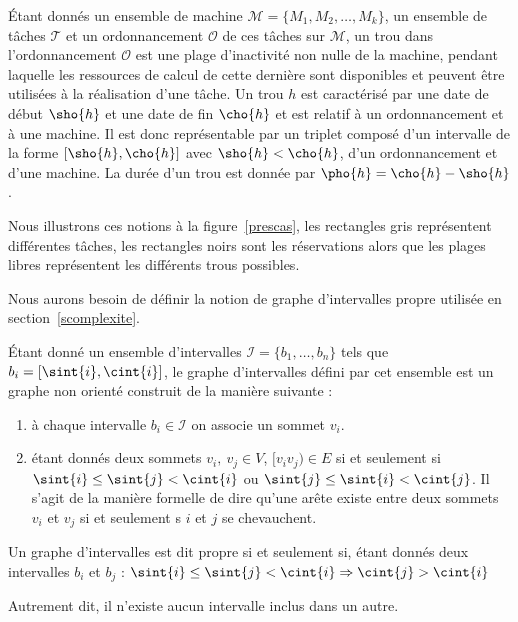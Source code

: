 \begin{ndf}[Trou]
    Étant donnés un ensemble de machine $\mathcal{M} = \{M_1, M_2, \dots, M_k\}$, un ensemble de
    tâches $\mathcal{T}$ et un ordonnancement $\mathcal{O}$ de ces tâches sur $\mathcal{M}$, un trou
    dans l'ordonnancement $\mathcal{O}$ est une plage d'inactivité non nulle de la machine, pendant
    laquelle les ressources de calcul de cette dernière sont disponibles et peuvent être utilisées à
    la réalisation d'une tâche. Un trou $h$ est caractérisé par une date de début $\sho{h}$ et
    une date de fin $\cho{h}$ et est relatif à un ordonnancement et à une machine. Il est donc
    représentable par un triplet composé d'un intervalle de la forme $[\sho{h}, \cho{h}]$ avec
    $\sho{h} < \cho{h}$, d'un ordonnancement et d'une machine. La durée d'un trou est donnée
    par $\pho{h} = \cho{h} - \sho{h}$.
\end{ndf}

Nous illustrons ces notions à la figure~\ref{prescas}, les rectangles gris
représentent différentes tâches, les rectangles noirs sont les réservations alors que les plages
libres représentent les différents trous possibles.

Nous aurons besoin de définir la notion de graphe d'intervalles propre utilisée en
section~\ref{scomplexite}.

\begin{ndf}
    Étant donné un ensemble d'intervalles $\mathcal{I} = \{b_1, \dots, b_n\}$ tels que $b_i = [\sint{i},
    \cint{i}]$, le graphe d'intervalles défini par cet ensemble est un graphe non orienté construit de la
    manière suivante :
    \begin{enumerate}
        \item à chaque intervalle $b_i \in \mathcal{I}$ on associe un sommet $v_i$.
        \item étant donnés deux sommets $v_i,\ v_j \in V$, $[v_iv_j) \in E$ si et seulement si 
            $\sint{i} \leq \sint{j} < \cint{i}$ ou $\sint{j} \leq \sint{i} < \cint{j}$. Il s'agit
            de la manière formelle de dire qu'une arête existe entre deux sommets $v_i$ et $v_j$ si
            et seulement s $i$ et $j$ se chevauchent.
    \end{enumerate}

    Un graphe d'intervalles est dit propre si et seulement si, étant donnés deux intervalles $b_i$
    et $b_j$ : $\sint{i} \leq \sint{j} < \cint{i} \Rightarrow \cint{j} > \cint{i}$

    Autrement dit, il n'existe aucun intervalle inclus dans un autre.
\end{ndf}

